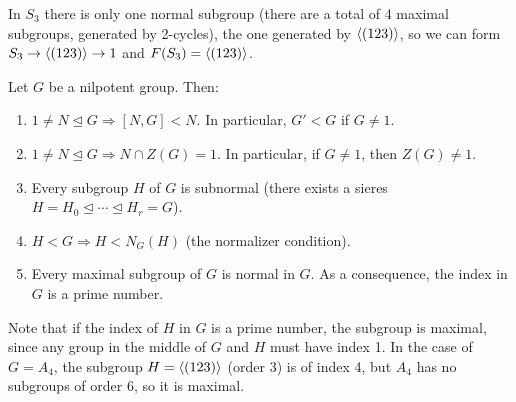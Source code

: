 \documentclass[twoside, 11pt]{article}
\begin{document}
\begin{ej}
In $S_3$ there is only one normal subgroup (there are a total of 4 maximal subgroups, generated by 2-cycles), the one generated by $\langle{(123)}\rangle$, so we can form $S_3\to \langle{(123)}\rangle\to 1$ and $F(S_3)=\langle{(123)}\rangle$. 
\end{ej}


\begin{teorema} Let $G$ be a nilpotent group. Then:
\begin{enumerate}
\item $1\neq N\trianglelefteq G\Rightarrow  [N,G]<N$. In particular, $G'<G$ if $G\neq 1$. 
\item $1\neq N\trianglelefteq G\Rightarrow N\cap Z(G)=1$. In particular, if $G\neq 1$, then $Z(G)\neq 1$. 
\item Every subgroup $H$ of $G$ is subnormal (there exists a sieres $H=H_0\trianglelefteq\cdots\trianglelefteq H_r= G$).
\item $H<G\Rightarrow H<N_G(H)$ (the normalizer condition). 
\item Every maximal subgroup of $G$ is normal in $G$. As a consequence, the index in $G$ is a prime number.
\end{enumerate}
\end{teorema}

Note that if the index of $H$ in $G$ is a prime number, the subgroup is maximal, since any group in the middle of $G$ and $H$ must have index 1. In the case of $G=A_4$, the subgroup $H=\langle{(123)}\rangle$ (order 3) is of index 4, but $A_4$ has no subgroups of order 6, so it is maximal. 
\end{document}
